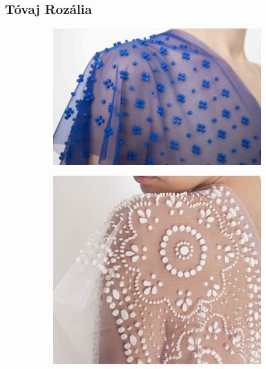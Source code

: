 \subsection{Tóvaj Rozália}

\begin{figure}[ht!]
	\centering
	\begin{subfigure}[b]{0.3\linewidth}
	  \includegraphics[width=\linewidth]{img/tr_01.png}
	  \caption{}
	\end{subfigure}
	\begin{subfigure}[b]{0.22\linewidth}
	  \includegraphics[width=\linewidth]{img/tr_02.png}
	  \caption{}
	\end{subfigure}

\end{figure}
